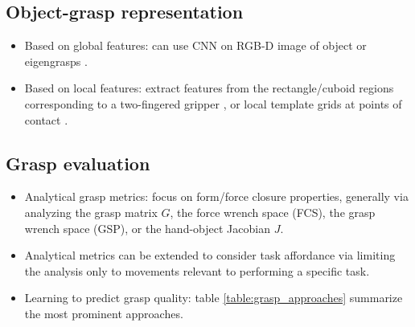 \documentclass[runningheads]{../llncs}
\begin{document}
\subsection*{Object-grasp representation}
\begin{itemize}
    \item Based on global features: can use CNN on RGB-D image of object \cite{mahler2017} or eigengrasps
            \cite{Ciocarlie2009,Goldfeder2011}.
    \item Based on local features: extract features from the rectangle/cuboid regions corresponding to a two-fingered
            gripper \cite{Detry2012,lenz2015,jiang2011}, or local template grids at points of contact
            \cite{Kappler2015}.
\end{itemize}

\subsection*{Grasp evaluation}

\begin{itemize}
    \item Analytical grasp metrics: focus on form/force closure properties, generally via analyzing the grasp matrix
            $ G $, the force wrench space (FCS), the grasp wrench space (GSP), or the hand-object Jacobian $ J $.
    \item Analytical metrics can be extended to consider task affordance via limiting the analysis only to movements
            relevant to performing a specific task.
    \item Learning to predict grasp quality: table \ref{table:grasp_approaches} summarize the most prominent approaches.
\end{itemize}

\end{document}
